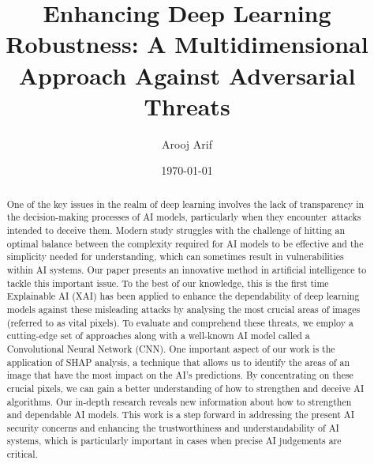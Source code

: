 \documentclass[10pt, conference, a4paper, final]{IEEEtran}
\title{Enhancing Deep Learning Robustness: A Multidimensional Approach Against Adversarial Threats}
\author{Arooj Arif}
\date{\today} %
\begin{document}
\maketitle %


\begin{abstract}
    One of the key issues in the realm of deep learning involves the lack of transparency 
    in the decision-making processes of AI models, particularly when they encounter attacks 
    intended to deceive them. Modern study struggles with the challenge of hitting an optimal 
    balance between the complexity required for AI models to be effective and the simplicity 
    needed for understanding, which can sometimes result in vulnerabilities within AI systems. 
    Our paper presents an innovative method in artificial intelligence to tackle this important
     issue. To the best of our knowledge, this is the first time Explainable AI (XAI) has been 
     applied to enhance the dependability of deep learning models against these misleading attacks
      by analysing the most crucial areas of images (referred to as vital pixels). 
      To evaluate and comprehend these threats, we employ a cutting-edge set of approaches along 
      with a well-known AI model called a Convolutional Neural Network (CNN). 
      One important aspect of our work is the application of SHAP analysis, a technique 
      that allows us to identify the areas of an image that have the most impact on the AI's 
      predictions. By concentrating on these crucial pixels, we can gain a better understanding 
      of how to strengthen and deceive AI algorithms. Our in-depth research reveals new information 
      about how to strengthen and dependable AI models. This work is a step forward in addressing 
      the present AI security concerns and enhancing the trustworthiness and understandability 
      of AI systems, which is particularly important in cases when precise AI judgements are 
      critical.



\end{abstract}
\end{document}
